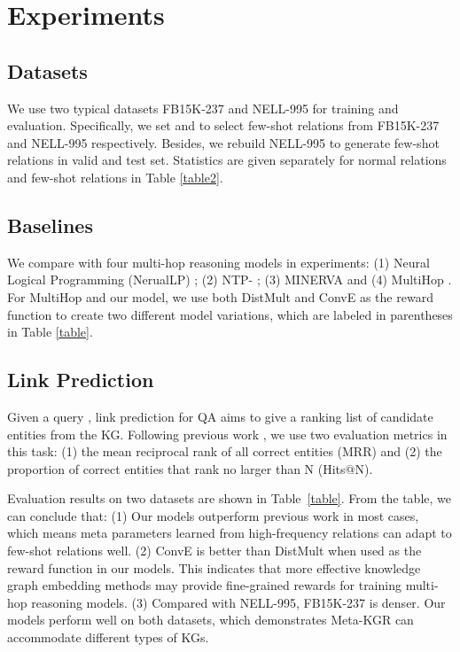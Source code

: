\documentclass[11pt,a4paper]{article}
\begin{document}
\section{Experiments}

\subsection{Datasets}

We use two typical datasets FB15K-237 \cite{FB15K-237} and NELL-995 \cite{DeepPath} for training and evaluation. Specifically, we set  and  to select few-shot relations from FB15K-237 and NELL-995 respectively. Besides, we rebuild NELL-995 to generate few-shot relations in valid and test set. Statistics are given separately for normal relations and few-shot relations in Table \ref{table2}.

\subsection{Baselines}

We compare with four multi-hop reasoning models in experiments: (1) Neural Logical Programming (NerualLP) \cite{neuralLP}; (2) NTP- \cite{NTP}; (3) MINERVA \cite{MINERVA} and (4) MultiHop \cite{MultiHop}. For MultiHop and our model, we use both DistMult \cite{DistMult} and ConvE \cite{ConvE} as the reward function to create two different model variations, which are labeled in parentheses in Table \ref{table}.

\subsection{Link Prediction}

Given a query , link prediction for QA aims to give a ranking list of candidate entities from the KG. Following previous work \cite{ConvE, MultiHop}, we use two evaluation metrics in this task: (1) the mean reciprocal rank of all correct entities (MRR) and (2) the proportion of correct entities that rank no larger than N (Hits@N). 

Evaluation results on two datasets are shown in Table~\ref{table}. From the table, we can conclude that: (1) Our models outperform previous work in most cases, which means meta parameters learned from high-frequency relations can adapt to few-shot relations well. (2) ConvE is better than DistMult when used as the reward function in our models. This indicates that more effective knowledge graph embedding methods may provide fine-grained rewards for training multi-hop reasoning models. (3) Compared with NELL-995, FB15K-237 is denser. Our models perform well on both datasets, which demonstrates Meta-KGR can accommodate different types of KGs.
\end{document}
